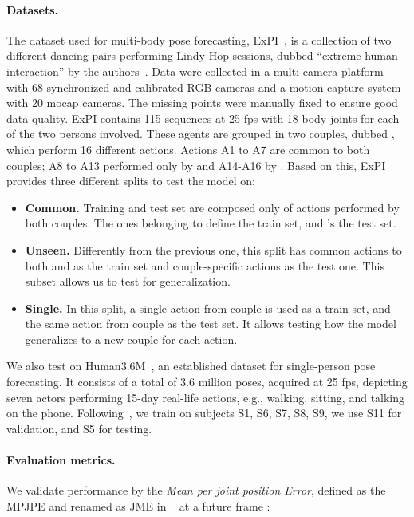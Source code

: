 \documentclass[10pt,twocolumn,letterpaper]{article}
\begin{document}
\paragraph{Datasets.} The dataset used for multi-body pose forecasting, ExPI~\cite{guo21}, is a collection of two different dancing pairs performing Lindy Hop sessions, dubbed ``extreme human interaction'' by the authors~\cite{guo21}.
Data were collected in a multi-camera platform with 68 synchronized and calibrated RGB cameras and a motion capture system with 20 mocap cameras. The missing points were manually fixed to ensure good data quality. 
ExPI contains 115 sequences at 25 fps with 18 body joints for each of the two persons involved.
These agents are grouped in two couples, dubbed , which perform 16 different actions. Actions A1 to A7 are common to both couples; A8 to A13 performed only by  and A14-A16 by .
Based on this, ExPI provides three different splits to test the model on:
\begin{itemize}
    \item \textbf{Common.} Training and test set are composed only of actions performed by both couples. The ones belonging to  define the train set, and 's the test set.
    \item \textbf{Unseen.} Differently from the previous one, this split has common actions to both  and  as the train set and couple-specific actions as the test one. 
    This subset allows us to test for generalization.
    \item \textbf{Single.}
    In this split, a single action from couple  is used as a train set, and the same action from couple  as the test set. 
    It allows testing how the model generalizes to a new couple for each action.
\end{itemize}

We also test on Human3.6M~\cite{h36m}, an established dataset for single-person pose forecasting.
It consists of a total of 3.6 million poses, acquired at 25 fps, depicting seven actors performing 15-day real-life actions, e.g., walking, sitting, and talking on the phone.
Following~\cite{mao21multi, mao20his, Dang21}, we train on subjects S1, S6, S7, S8, S9, we use S11 for validation, and S5 for testing. 


\paragraph{Evaluation metrics.}
We validate performance by the \textit{Mean per joint position Error}, defined as the MPJPE \cite{h36m, mao19ltd} and renamed as JME in ~\cite{guo21}  at a future frame :
\end{document}

